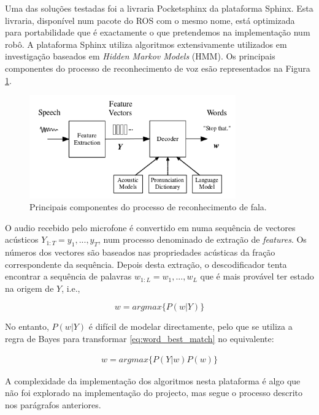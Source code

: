 \documentclass[journal]{IEEEtran}
\begin{document}
Uma das soluções testadas foi a livraria Pocketsphinx da plataforma Sphinx. Esta livraria, disponível num pacote do ROS com o mesmo nome, está optimizada para portabilidade que é exactamente o que pretendemos na implementação num robô. A plataforma Sphinx utiliza algoritmos extensivamente utilizados em investigação baseados em \textit{Hidden Markov Models} (HMM). Os principais componentes do processo de reconhecimento de voz esão representados na Figura \ref{fig:voicerecprocess}.

\begin{figure}[ht]
  \centering
  \includegraphics[width=21pc]{voice_rec_process.png}
  \caption{Principais componentes do processo de reconhecimento de fala.}
  \label{fig:voicerecprocess}
\end{figure}

O audio recebido pelo microfone é convertido em numa sequência de vectores acústicos $Y_{1:T}=y_1,...,y_T$, num processo denominado de extração de \textit{features}. Os números dos vectores são baseados nas propriedades acústicas da fração correspondente da sequência. Depois desta extração, o descodificador tenta encontrar a sequência de palavras $w_{1:L}=w_1,...,w_L$ que é mais provável ter estado na origem de $Y$, i.e.,

\begin{equation}
  w=arg max \{ P(w|Y) \}
\label{eq:word_best_match}
\end{equation}

No entanto, $P(w|Y)$ é difícil de modelar directamente, pelo que se utiliza a regra de Bayes para transformar \ref{eq:word_best_match} no equivalente:

\begin{eqnarray}
  \label{eq:word_bm_equi}
  w = arg max \{ P(Y|w) P(w) \}
\end{eqnarray}

A complexidade da implementação dos algoritmos nesta plataforma  é algo que não foi explorado na implementação do projecto, mas segue o processo descrito nos parágrafos anteriores.
\end{document}
